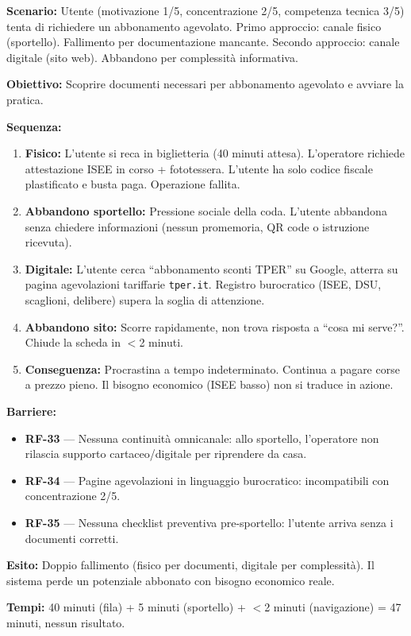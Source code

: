 ﻿\documentclass[11pt,a4paper]{article}
\begin{document}
\begin{tcolorbox}[base]
    {\small
    \textbf{Scenario:} Utente (motivazione 1/5, concentrazione 2/5, competenza tecnica 3/5) tenta di richiedere un abbonamento agevolato. Primo approccio: canale fisico (sportello). Fallimento per documentazione mancante. Secondo approccio: canale digitale (sito web). Abbandono per complessità informativa.

    \textbf{Obiettivo:} Scoprire documenti necessari per abbonamento agevolato e avviare la pratica.

    \textbf{Sequenza:}
    \begin{enumerate}
        \item \textbf{Fisico:} L'utente si reca in biglietteria (40 minuti attesa). L'operatore richiede attestazione ISEE in corso + fototessera. L'utente ha solo codice fiscale plastificato e busta paga. Operazione fallita.
        \item \textbf{Abbandono sportello:} Pressione sociale della coda. L'utente abbandona senza chiedere informazioni (nessun promemoria, QR code o istruzione ricevuta).
        \item \textbf{Digitale:} L'utente cerca ``abbonamento sconti TPER'' su Google, atterra su pagina agevolazioni tariffarie \texttt{tper.it}. Registro burocratico (ISEE, DSU, scaglioni, delibere) supera la soglia di attenzione.
        \item \textbf{Abbandono sito:} Scorre rapidamente, non trova risposta a ``cosa mi serve?''. Chiude la scheda in $<$2 minuti.
        \item \textbf{Conseguenza:} Procrastina a tempo indeterminato. Continua a pagare corse a prezzo pieno. Il bisogno economico (ISEE basso) non si traduce in azione.
    \end{enumerate}

    \textbf{Barriere:}
    \begin{itemize}
        \item \textbf{RF-33} --- Nessuna continuità omnicanale: allo sportello, l'operatore non rilascia supporto cartaceo/digitale per riprendere da casa.
        \item \textbf{RF-34} --- Pagine agevolazioni in linguaggio burocratico: incompatibili con concentrazione 2/5.
        \item \textbf{RF-35} --- Nessuna checklist preventiva pre-sportello: l'utente arriva senza i documenti corretti.
    \end{itemize}

    \textbf{Esito:} Doppio fallimento (fisico per documenti, digitale per complessità). Il sistema perde un potenziale abbonato con bisogno economico reale.

    \textbf{Tempi:} 40 minuti (fila) + 5 minuti (sportello) + $<$2 minuti (navigazione) = 47 minuti, nessun risultato.
    }
\end{tcolorbox}
\end{document}
